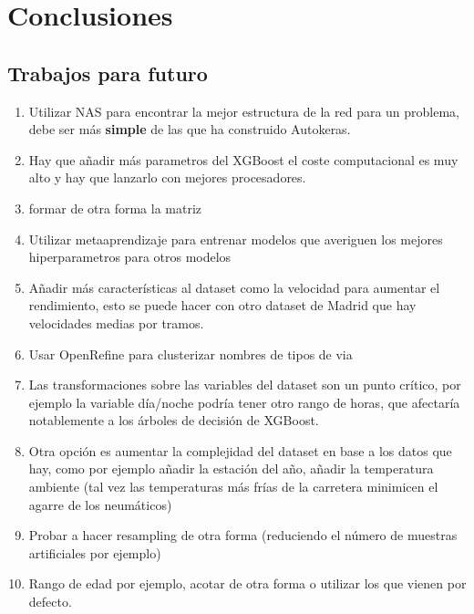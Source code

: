 
\chapter{Conclusiones}
\label{conclusiones}



\section{Trabajos para futuro}

	\begin{enumerate}
		\item Utilizar NAS para encontrar la mejor estructura de la red para un problema, debe ser más \textbf{simple} de las que ha construido Autokeras.
		\item Hay que añadir más parametros del XGBoost el coste computacional es muy alto y hay que lanzarlo con mejores procesadores.
		\item formar de otra forma la matriz
		\item Utilizar metaaprendizaje para entrenar modelos que averiguen los mejores hiperparametros para otros modelos
		\item Añadir más características al dataset como la velocidad para aumentar el rendimiento, esto se puede hacer con otro dataset de Madrid que hay velocidades medias por tramos.
		\item Usar OpenRefine para clusterizar nombres de tipos de via
		\item Las transformaciones sobre las variables del dataset son un punto crítico, por ejemplo la variable día/noche podría tener otro rango de horas, que afectaría notablemente a los árboles de decisión de XGBoost.
		\item Otra opción es aumentar la complejidad del dataset en base a los datos que hay, como por ejemplo añadir la estación del año, añadir la temperatura ambiente (tal vez las temperaturas más frías de la carretera minimicen el agarre de los neumáticos)
		\item Probar a hacer resampling de otra forma (reduciendo el número de muestras artificiales por ejemplo)
		\item Rango de edad por ejemplo, acotar de otra forma o utilizar los que vienen por defecto.
	\end{enumerate}